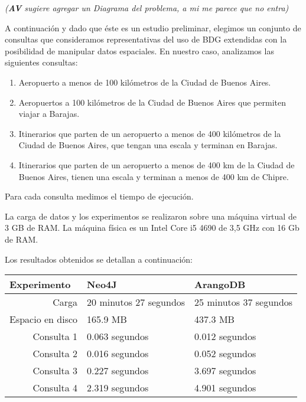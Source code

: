 \documentclass{llncs}
\begin{document}
\textit{(\textbf{AV} sugiere agregar un Diagrama del problema, a mi me parece que no entra)
}

A continuación y dado que éste es un estudio preliminar, elegimos un conjunto de consultas que consideramos representativas del uso de BDG extendidas con la posibilidad de manipular datos espaciales. En nuestro caso, analizamos las siguientes consultas:

\begin{enumerate}
\item Aeropuerto a menos de 100 kilómetros de la Ciudad de Buenos Aires.
\item Aeropuertos a 100 kilómetros de la Ciudad de Buenos Aires que permiten viajar a Barajas.
\item Itinerarios que parten de un aeropuerto a menos de 400 kilómetros de la Ciudad de Buenos Aires, que tengan una escala y terminan en Barajas.
\item Itinerarios que parten de un aeropuerto a menos de 400 km de la Ciudad de Buenos Aires, tienen una escala y terminan a menos de 400 km de Chipre.
\end{enumerate}

Para cada consulta medimos el tiempo de ejecución.

La carga de datos y los experimentos se realizaron sobre una máquina virtual de 3 GB de RAM. La máquina física es un Intel Core i5 4690 de 3,5 GHz con 16 Gb de RAM.

Los resultados obtenidos se detallan a continuación:

\begin{table}
\begin{center}
\begin{tabular}{r@{\quad}ll}%
\hline
\multicolumn{1}{l}{Experimento}&\multicolumn{1}{l}{Neo4J}&\multicolumn{1}{l}{ArangoDB}\\
\hline\rule{0pt}{12pt}
Carga & 20 minutos 27 segundos & 25 minutos 37 segundos \\
Espacio en disco & 165.9 MB & 437.3 MB \\
Consulta 1 & 0.063 segundos & 0.012 segundos \\
Consulta 2 & 0.016 segundos & 0.052 segundos \\
Consulta 3 & 0.227 segundos & 3.697 segundos \\
Consulta 4 & 2.319 segundos & 4.901 segundos \\
\hline
\end{tabular}
\end{center}
\end{table}
\end{document}
